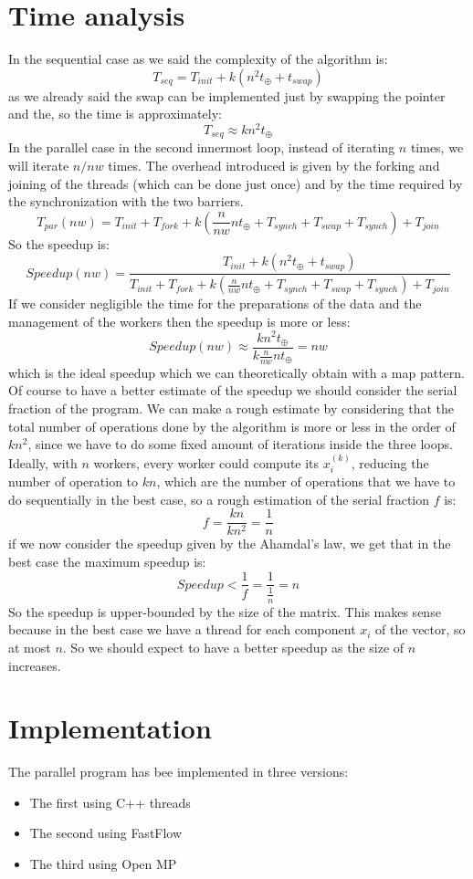 \documentclass{article}
\begin{document}
	\section{Time analysis}
	In the sequential case as we said the complexity of the algorithm is:
	\[ T_{seq} = T_{init} + k(n^2t_\oplus + t_{swap}) \]
	as we already said the swap can be implemented just by swapping the pointer and the, so the time is approximately:
	\[ T_{seq} \approx kn^2t_\oplus\]
	In the parallel case in the second innermost loop, instead of iterating $n$ times, we will iterate $n/nw$ times. The overhead introduced is given by the forking and joining of the threads (which can be done just once) and by the time required by the synchronization with the two barriers. 
	\[T_{par}(nw) = T_{init} + T_{fork} + k(\frac{n}{nw}nt_\oplus + T_{synch} + T_{swap} + T_{synch}) + T_{join} \]
	So the speedup is:
	\[ Speedup(nw) = \frac{T_{init} + k(n^2t_\oplus + t_{swap})}{T_{init} + T_{fork} + k(\frac{n}{nw}nt_\oplus + T_{synch} + T_{swap} + T_{synch}) + T_{join}}\]
	If we consider negligible the time for the preparations of the data and the management of the workers then the speedup is more or less: 
	\[ Speedup(nw) \approx \frac{kn^2t_\oplus}{k\frac{n}{nw}nt_\oplus} = nw\]
	which is the ideal speedup which we can theoretically obtain with a map pattern. Of course to have a better estimate of the speedup we should consider the serial fraction of the program. We can make a rough estimate by considering that the total number of operations done by the algorithm is more or less in the order of $kn^2$, since we have to do some fixed amount of iterations inside the three loops. Ideally, with $n$ workers, every worker could compute its $x_i^{(k)}$, reducing the number of operation to $kn$, which are the number of operations that we have to do sequentially in the best case, so a rough estimation of the serial fraction $f$ is: 
	\[ f = \frac{kn}{kn^2} = \frac{1}{n}\]
	if we now consider the speedup given by the Ahamdal's law, we get that in the best case the maximum speedup is:
	\[ Speedup < \frac{1}{f} = \frac{1}{\frac{1}{n}} = n\]
	So the speedup is upper-bounded by the size of the matrix. This makes sense because in the best case we have a thread for each component $x_i$ of the vector, so at most $n$. So we should expect to have a better speedup as the size of $n$ increases. 
	
	\section{Implementation}
	The parallel program has bee implemented in three versions:
	\begin{itemize}
		\item The first using C++ threads 
		\item The second using FastFlow
		\item The third using Open MP
	\end{itemize}
\end{document}
